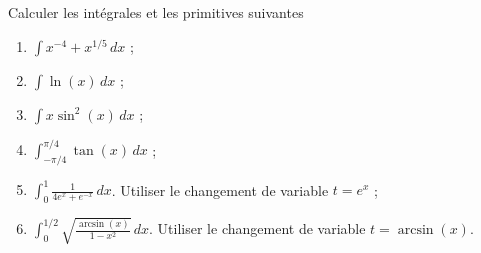 
\begin{exercice}\label{exosession1-0002}

Calculer les intégrales et les primitives suivantes

\begin{multicols}{2}
  \begin{enumerate}
  \item $\displaystyle \int x^{-4} + x^{1/5}\, dx$ ;
  \item $\displaystyle \int \ln(x)\, dx$ ;
  \item $\displaystyle \int x\sin^2(x)\, dx$ ;
  \item $\displaystyle \int_{-\pi/4}^{\pi/4}\tan(x)\, dx$ ; 
  \item $\displaystyle \int_{0}^{1}\frac{1}{4e^x+e^{-x} }\, dx$. Utiliser le changement de variable $t = e^x$  ; 
  \item $\displaystyle \int_{0}^{1/2}\sqrt{\frac{\arcsin(x)}{1-x^2}}\, dx$. Utiliser le changement de variable $t = \arcsin(x)$. 
  \end{enumerate}
\end{multicols}

\end{exercice}

